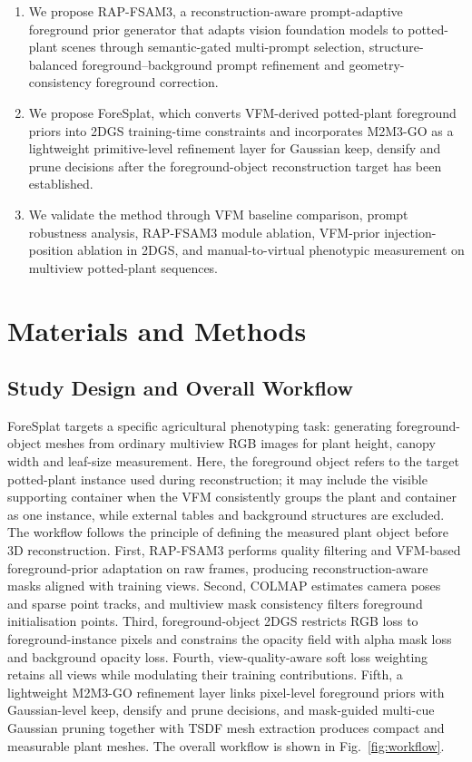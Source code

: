 \documentclass[a4paper]{cas-sc}
\begin{document}
\begin{enumerate}
\item We propose RAP-FSAM3, a reconstruction-aware prompt-adaptive foreground prior generator that adapts vision foundation models to potted-plant scenes through semantic-gated multi-prompt selection, structure-balanced foreground--background prompt refinement and geometry-consistency foreground correction.
\item We propose ForeSplat, which converts VFM-derived potted-plant foreground priors into 2DGS training-time constraints and incorporates M2M3-GO as a lightweight primitive-level refinement layer for Gaussian keep, densify and prune decisions after the foreground-object reconstruction target has been established.
\item We validate the method through VFM baseline comparison, prompt robustness analysis, RAP-FSAM3 module ablation, VFM-prior injection-position ablation in 2DGS, and manual-to-virtual phenotypic measurement on multiview potted-plant sequences.
\end{enumerate}

\section{Materials and Methods}\label{sec:materials-and-methods}

\subsection{Study Design and Overall Workflow}\label{sec:study-design-and-overall-workflow}

ForeSplat targets a specific agricultural phenotyping task: generating foreground-object meshes from ordinary multiview RGB images for plant height, canopy width and leaf-size measurement. Here, the foreground object refers to the target potted-plant instance used during reconstruction; it may include the visible supporting container when the VFM consistently groups the plant and container as one instance, while external tables and background structures are excluded. The workflow follows the principle of defining the measured plant object before 3D reconstruction. First, RAP-FSAM3 performs quality filtering and VFM-based foreground-prior adaptation on raw frames, producing reconstruction-aware masks aligned with training views. Second, COLMAP estimates camera poses and sparse point tracks, and multiview mask consistency filters foreground initialisation points. Third, foreground-object 2DGS restricts RGB loss to foreground-instance pixels and constrains the opacity field with alpha mask loss and background opacity loss. Fourth, view-quality-aware soft loss weighting retains all views while modulating their training contributions. Fifth, a lightweight M2M3-GO refinement layer links pixel-level foreground priors with Gaussian-level keep, densify and prune decisions, and mask-guided multi-cue Gaussian pruning together with TSDF mesh extraction produces compact and measurable plant meshes. The overall workflow is shown in Fig.~\ref{fig:workflow}.
\end{document}
